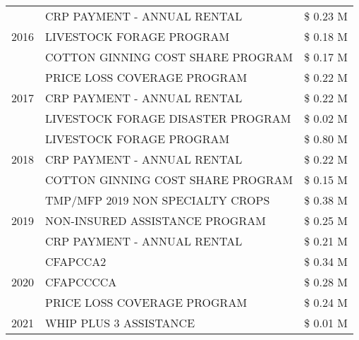 \begin{tabular}{llr}
\multirow[t]{3}{*}{2016} & CRP PAYMENT - ANNUAL RENTAL & \$ 0.23 M \\
 & LIVESTOCK FORAGE PROGRAM & \$ 0.18 M \\
 & COTTON GINNING COST SHARE PROGRAM & \$ 0.17 M \\
\cline{1-3}
\multirow[t]{3}{*}{2017} & PRICE LOSS COVERAGE PROGRAM & \$ 0.22 M \\
 & CRP PAYMENT - ANNUAL RENTAL & \$ 0.22 M \\
 & LIVESTOCK FORAGE DISASTER PROGRAM & \$ 0.02 M \\
\cline{1-3}
\multirow[t]{3}{*}{2018} & LIVESTOCK FORAGE PROGRAM & \$ 0.80 M \\
 & CRP PAYMENT - ANNUAL RENTAL & \$ 0.22 M \\
 & COTTON GINNING COST SHARE PROGRAM & \$ 0.15 M \\
\cline{1-3}
\multirow[t]{3}{*}{2019} & TMP/MFP 2019 NON SPECIALTY CROPS & \$ 0.38 M \\
 & NON-INSURED ASSISTANCE PROGRAM & \$ 0.25 M \\
 & CRP PAYMENT - ANNUAL RENTAL & \$ 0.21 M \\
\cline{1-3}
\multirow[t]{3}{*}{2020} & CFAPCCA2 & \$ 0.34 M \\
 & CFAPCCCCA & \$ 0.28 M \\
 & PRICE LOSS COVERAGE PROGRAM & \$ 0.24 M \\
\cline{1-3}
2021 & WHIP PLUS 3 ASSISTANCE & \$ 0.01 M \\
\cline{1-3}
\bottomrule
\end{tabular}
